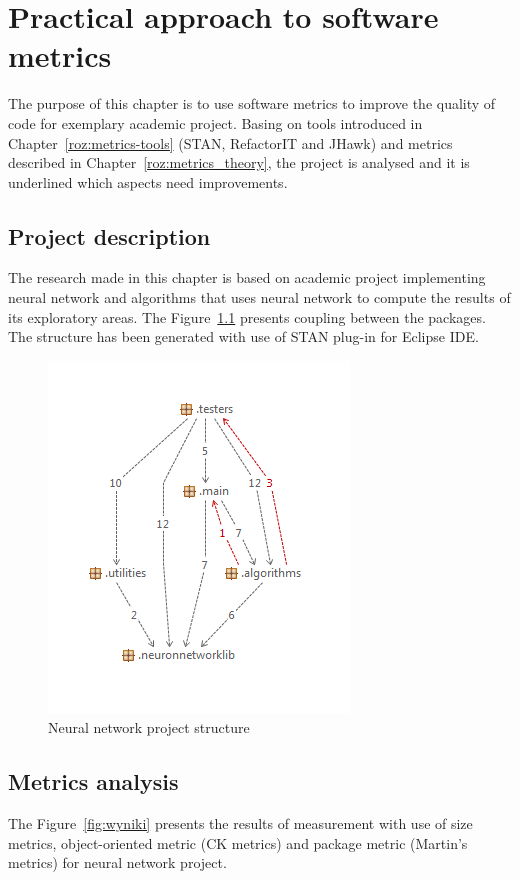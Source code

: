 \chapter{Practical approach to software metrics} \label{roz:metrics-practic}

The purpose of this chapter is to use software metrics to improve the quality of code for exemplary academic project. Basing on tools introduced in Chapter~\ref{roz:metrics-tools} (STAN, RefactorIT and JHawk) and metrics described in Chapter~\ref{roz:metrics_theory}, the project is analysed and it is underlined which aspects need improvements.

\section{Project description}
The research made in this chapter is based on academic project implementing neural network and algorithms that uses neural network to compute the results of its exploratory areas. The Figure~\ref{fig:structureneural} presents coupling between the packages. The structure has been generated with use of STAN plug-in for Eclipse \ac{IDE}. 

\begin{figure}[h!]
 	\centering
 	\includegraphics[scale=1]{img/str.png} 
 	\caption{Neural network project structure}		
 	\label{fig:structureneural}
 \end{figure} 

\section{Metrics analysis}
The Figure~\ref{fig:wyniki} presents the results of measurement with use of size metrics, object-oriented metric (\ac{CK metrics}) and package metric (Martin's metrics) for neural network project.  

